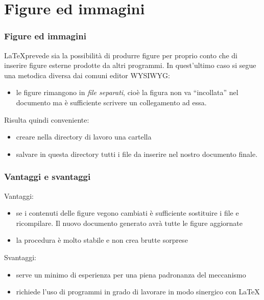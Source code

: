 \documentclass[svgnames,%
	ucs,%
	pdftex]{guitbeamer}
\begin{document}
\section{Figure ed immagini}
\begin{frame}
  \frametitle{Figure ed immagini}
	\LaTeX prevede sia la possibilit\`a di produrre figure per proprio conto che di inserire figure esterne prodotte da altri programmi. In quest'ultimo caso si segue una metodica diversa dai comuni editor WYSIWYG:
	\begin{itemize}
		\item le figure rimangono in \emph{file separati}, cio\`e la figura non va ``incollata'' nel documento ma \`e sufficiente scrivere un collegamento ad essa.\\
	\end{itemize}
	Risulta quindi conveniente:
	\begin{itemize}
		\item creare nella directory di lavoro una cartella 
		\item salvare in questa directory tutti i file da inserire nel nostro documento finale.
	\end{itemize}
\end{frame}
\begin{frame}
  \frametitle{Vantaggi e svantaggi}
	Vantaggi:
	\begin{itemize}
		\item se i contenuti delle figure vegono cambiati \`e sufficiente sostituire i file e ricompilare. Il nuovo documento generato avr\`a tutte le figure aggiornate
		\item la procedura \`e molto stabile e non crea brutte sorprese
	\end{itemize}
	Svantaggi:
	\begin{itemize}
		\item serve un minimo di esperienza per una piena padronanza del meccanismo 
		\item richiede l'uso di programmi in grado di lavorare in modo sinergico con \LaTeX
	\end{itemize}
\end{frame}
\end{document}
